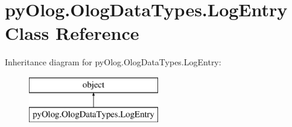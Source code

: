 \hypertarget{classpyOlog_1_1OlogDataTypes_1_1LogEntry}{\section{py\-Olog.\-Olog\-Data\-Types.\-Log\-Entry Class Reference}
\label{classpyOlog_1_1OlogDataTypes_1_1LogEntry}
}
Inheritance diagram for py\-Olog.\-Olog\-Data\-Types.\-Log\-Entry\-:\begin{figure}[H]
\begin{center}
\leavevmode
\includegraphics[height=2.000000cm]{classpyOlog_1_1OlogDataTypes_1_1LogEntry}
\end{center}
\end{figure}
